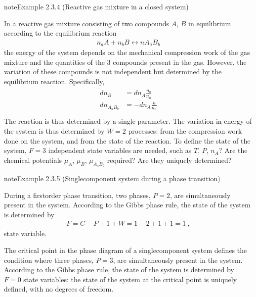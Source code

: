 \documentclass[letterpaper,10pt,english]{jupyterBook}
\begin{document}
\label{ch/principles-gibbs-phase-rule:example-7}
\begin{sphinxadmonition}{note}{Example 2.3.4 (Reactive gas mixture in a closed system)}



\sphinxAtStartPar
In a reactive gas mixture consisting of two compounds \(A\), \(B\) in equilibrium according to the equilibrium reaction
\begin{equation*}
\begin{split}n_a A + n_b B \leftrightarrow n A_a B_b\end{split}
\end{equation*}
\sphinxAtStartPar
the energy of the system depends on the mechanical compression work of the gas mixture and the quantities of the 3 compounds present in the gas. However, the variation of these compounds is not independent but determined by the equilibrium reaction. Specifically,
\begin{equation*}
\begin{split}\begin{aligned}
  d n_{B} & = d n_{A} \frac{n_b}{n_a} \\
  d n_{A_a B_b} & = - d n_{A} \frac{n}{n_a} \\
\end{aligned}\end{split}
\end{equation*}
\sphinxAtStartPar
The reaction is thus determined by a single parameter. The variation in energy of the system is thus determined by \(W=2\) processes: from the compression work done on the system, and from the state of the reaction. To define the state of the system, \(F=3\) independent state variables are needed, such as  \(T\), \(P\), \(n_A\)? Are the chemical potentials \(\mu_A\), \(\mu_B\), \(\mu_{A_a B_b}\) required? Are they uniquely determined?
\end{sphinxadmonition}
\label{ch/principles-gibbs-phase-rule:example-8}
\begin{sphinxadmonition}{note}{Example 2.3.5 (Single\sphinxhyphen{}component system during a phase transition)}



\sphinxAtStartPar
{} During a first\sphinxhyphen{}order phase transition, two phases, \(P = 2\), are simultaneously present in the system. According to the Gibbs phase rule, the state of the system is determined by
\begin{equation*}
\begin{split}F = C - P + 1 + W = 1 - 2 + 1 + 1 = 1 \ ,\end{split}
\end{equation*}
\sphinxAtStartPar
state variable.

\sphinxAtStartPar
{} The critical point in the phase diagram of a single\sphinxhyphen{}component system defines the condition where three phases, \(P = 3\), are simultaneously present in the system. According to the Gibbs phase rule, the state of the system is determined by \(F = 0\) state variables: the state of the system at the critical point is uniquely defined, with no degrees of freedom.
\end{sphinxadmonition}
\end{document}
